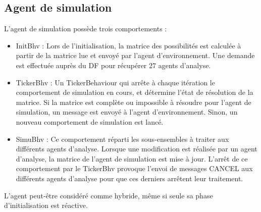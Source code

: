 \documentclass[a4paper,11pt]{article}
\begin{document}
\subsection{Agent de simulation}
L'agent de simulation possède trois comportements :
\begin{itemize}
\item InitBhv : Lors de l'initialisation, la matrice des possibilités est calculée à partir de la matrice lue et envoyé par l'agent d'environnement.
Une demande est effectuée auprès du DF pour récupérer 27 agents d'analyse.
\item TickerBhv : Un TickerBehaviour qui arrête à chaque itération le comportement de simulation en cours, et détermine l'état de résolution de la matrice.
Si la matrice est complète ou impossible à résoudre pour l'agent de simulation, un message est envoyé à l'agent d'environnement.
Sinon, un nouveau comportement de simulation est lancé.
\item SimuBhv : Ce comportement réparti les sous-ensembles à traiter aux différents agents d'analyse. 
Lorsque une modification est réalisée par un agent d'analyse, la matrice de l'agent de simulation est mise à jour. L'arrêt de ce comportement par le TickerBhv provoque l'envoi de messages CANCEL aux différents agents d'analyse pour que ces derniers arrêtent leur traitement.
\end{itemize}
L'agent peut-être considéré comme hybride, même si seule sa phase d'initialisation est réactive.
\end{document}
